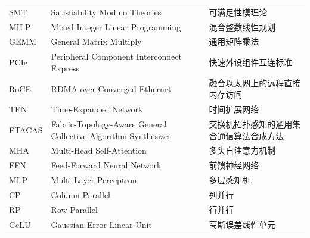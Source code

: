 \begin{center}
\begin{longtable}{m{2cm}m{8cm}m{5cm}}
        SMT&Satisfiability Modulo Theories&可满足性模理论\\
        MILP&Mixed Integer Linear Programming&混合整数线性规划\\
        GEMM&General Matrix Multiply&通用矩阵乘法\\
        PCIe&Peripheral Component Interconnect Express&快速外设组件互连标准\\
        RoCE&RDMA over Converged Ethernet&融合以太网上的远程直接内存访问\\
        TEN&Time-Expanded Network&时间扩展网络\\
        FTACAS&Fabric-Topology-Aware General Collective Algorithm Synthesizer&交换机拓扑感知的通用集合通信算法合成方法\\
        MHA&Multi-Head Self-Attention&多头自注意力机制\\
        FFN&Feed-Forward Neural Network&前馈神经网络\\
        MLP&Multi-Layer Perceptron&多层感知机\\
        CP&Column Parallel&列并行\\
        RP&Row Parallel&行并行\\
        GeLU&Gaussian Error Linear Unit&高斯误差线性单元\\
	\end{longtable}
\end{center}